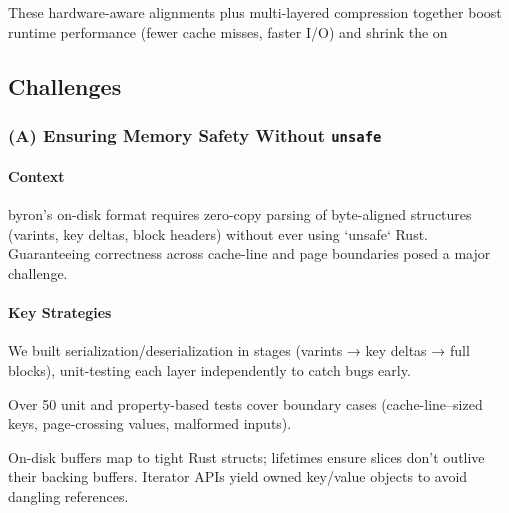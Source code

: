 \documentclass[10pt]{article}
\begin{document}

These hardware-aware alignments plus multi-layered compression together boost runtime performance (fewer cache misses, faster I/O) and shrink the on

\subsection{Challenges}

\subsubsection*{(A) Ensuring Memory Safety Without \texttt{unsafe}}

\paragraph{Context}  
byron’s on-disk format requires zero-copy parsing of byte-aligned structures (varints, key deltas, block headers) without ever using `unsafe` Rust. Guaranteeing correctness across cache-line and page boundaries posed a major challenge.

\paragraph{Key Strategies}
\begin{description}[leftmargin=1em,labelwidth=*,itemsep=0.5ex]
  \item[Layered Verification] We built serialization/deserialization in stages (varints → key deltas → full blocks), unit-testing each layer independently to catch bugs early.
  \item[Extensive Test Suite] Over 50 unit and property-based tests cover boundary cases (cache-line–sized keys, page-crossing values, malformed inputs).
  \item[Rust Type \& Lifetime Safety] On-disk buffers map to tight Rust structs; lifetimes ensure slices don’t outlive their backing buffers. Iterator APIs yield owned key/value objects to avoid dangling references.
\end{description}
\end{document}
